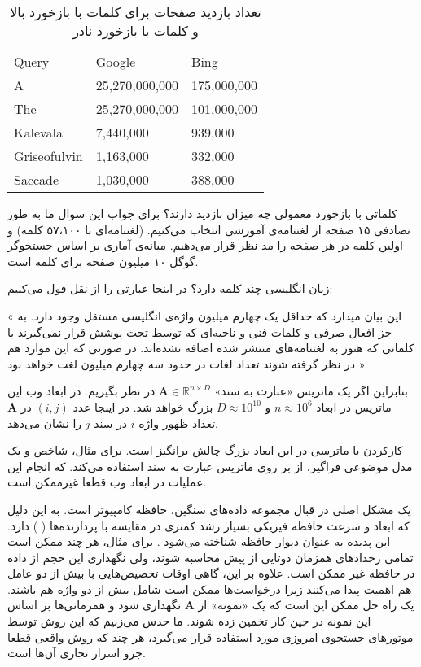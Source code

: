\begin{table}[h]
\centering
\begin{latin}
\begin{tabular}{lll}
\hline
Query        & Google         & Bing        \\ \hhline{===}
A            & 25,270,000,000 & 175,000,000 \\
The          & 25,270,000,000 & 101,000,000 \\
Kalevala     & 7,440,000      & 939,000     \\
Griseofulvin & 1,163,000      & 332,000     \\
Saccade      & 1,030,000      & 388,000     \\
\hline
\end{tabular}
\end{latin}
\caption{
تعداد بازدید صفحات برای کلمات با بازخورد بالا و کلمات با بازخورد نادر
}
\label{tab:searchengin}
\end{table}


کلماتی با بازخورد معمولی چه میزان بازدید دارند؟ برای جواب این سوال ما به طور تصادفی ۱۵ صفحه از لغتنامه‌‌ی آموزشی انتخاب می‌کنیم.
\cite{litez94}
(لغتنامه‌ای با ۵۷،۱۰۰ کلمه) و اولین کلمه در هر صفحه را مد نظر قرار می‌دهیم. میانه‌ی آماری بر اساس جستجو‌گر گوگل ۱۰ میلیون صفحه برای کلمه است.

زبان انگلیسی چند کلمه دارد؟ در اینجا عبارتی را از 
نقل قول می‌کنیم:

« این بیان میدارد که حداقل یک چهارم میلیون واژه‌ی انگلیسی مستقل وجود دارد. به جز افعال صرفی و کلمات فنی و ناحیه‌ای که توسط 
تحت پوشش قرار نمی‌گیرند یا کلماتی که هنوز به لغتنامه‌های منتشر شده اضافه نشده‌اند. در صورتی که این موارد هم در نظر گرفته شوند تعداد لغات در حدود سه چهارم میلیون لغت خواهد بود »

بنابراین اگر یک ماتریس «عبارت به سند» 
$\mathbf{A} \in \mathbb{R}^{n \times D}$
در نظر بگیریم. در ابعاد وب این ماتریس در ابعاد 
$n \approx 10^6$
و 
$D \approx 10^10$
بزرگ خواهد شد.
در اینجا عدد 
$(i,j)$
در 
$\mathbf{A}$
تعداد ظهور واژه 
$i$
در سند 
$j$
را نشان می‌دهد.

کارکردن با ماترسی در این ابعاد بزرگ چالش برانگیز است. برای مثال، شاخص 
\cite{litez58}
و یک مدل موضوعی فراگیر، از 
بر روی ماتریس عبارت به سند استفاده می‌کند. که انجام این عملیات در ابعاد وب قطعا غیرممکن است.

یک مشکل اصلی در قبال مجموعه داده‌های سنگین، حافظه کامپیوتر است. به این دلیل که ابعاد و سرعت حافظه فیزیکی بسیار رشد کمتری در مقایسه با پردازنده‌ها (
) دارد. این پدیده به عنوان دیوار حافظه شناخته می‌شود
\cite{litez139, litez168}
. برای مثال،‌ هر چند ممکن است تمامی رخداد‌های همزمان دوتایی از پیش محاسبه شوند، ولی نگهداری این حجم از داده در حافظه غیر ممکن است. علاوه بر این، گاهی اوقات تخصیص‌‌هایی با بیش از دو عامل هم اهمیت پیدا می‌کنند زیرا درخواست‌ها ممکن است شامل بیش از دو واژه هم باشند. یک راه حل ممکن این است که یک «نمونه» از 
$\mathbf{A}$
 نگهداری شود و همزمانی‌ها بر اساس این نمونه در حین کار تخمین زده شوند. ما حدس می‌زنیم که این روش توسط موتورهای جستجوی امروزی مورد استفاده قرار می‌گیرد، هر چند که روش واقعی قطعا جزو اسرار تجاری آن‌ها است.

